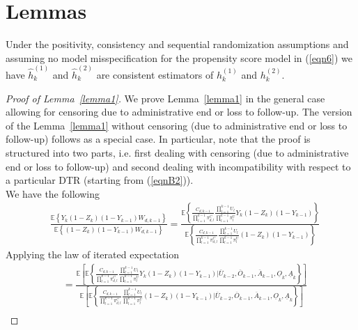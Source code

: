 \documentclass[12pt]{article}
\begin{document}
\section{Lemmas} \label{app1}

\begin{lemma}
\label{lemma1}
Under the positivity, consistency and sequential randomization assumptions and assuming no model misspecification for the propensity score model in (\ref{eqn6}) we have $\hat{h}_k^{(1)}$ and $\hat{h}_k^{(2)}$ are consistent estimators of $h_k^{(1)}$ and $h_k^{(2)}$. 
\end{lemma}

\begin{proof}[Proof of Lemma~\ref{lemma1}]
We prove Lemma~\ref{lemma1} in the general case allowing for censoring due to administrative end or loss to follow-up. The version of the Lemma~\ref{lemma1} without censoring (due to administrative end or loss to follow-up) follows as a special case. In particular, note that the proof is structured into two parts, i.e. first dealing with censoring (due to administrative end or loss to follow-up) and second dealing with incompatibility with respect to a particular DTR (starting from (\ref{eqnB2})).   \\
We have the following
\begin{align*}
&\frac{\mathbb{E} \left\lbrace Y_{k} \left(1-Z_{k} \right) \left(1-Y_{k-1} \right) W_{d,k-1} \right\rbrace}{\mathbb{E} \left\lbrace \left(1-Z_{k} \right) \left(1-Y_{k-1} \right) W_{d,k-1} \right\rbrace} = \frac{\mathbb{E} \left\lbrace \frac{C_{d,k-1}}{\prod_{l=1}^{k-1}  \pi^C_{d,l}} \frac{ \prod_{l=1}^{k-1} U_{l}}{\prod_{l=1}^{k-1}  \pi^U_{l}} Y_{k} \left(1-Z_{k} \right) \left(1-Y_{k-1} \right) \right\rbrace}{\mathbb{E} \left\lbrace \frac{C_{d,k-1}}{\prod_{l=1}^{k-1}  \pi^C_{d,l}} \frac{ \prod_{l=1}^{k-1} U_{l}}{\prod_{l=1}^{k-1}  \pi^U_{l}} \left(1-Z_{k} \right) \left(1-Y_{k-1} \right) \right\rbrace} 
\end{align*}
Applying the law of iterated expectation
\begin{align*}
&= \frac{\mathbb{E} \left[ \mathbb{E} \left\lbrace \frac{C_{d,k-1}}{\prod_{l=1}^{k-1}  \pi^C_{d,l}} \frac{ \prod_{l=1}^{k-1} U_{l}}{\prod_{l=1}^{k-1}  \pi^U_{l}} Y_{k} \left(1-Z_{k} \right) \left(1-Y_{k-1} \right) \vert \overline{U}_{k-2}, \overline{O}_{k-1}, \overline{A}_{k-1}, \underline{O}_{k}, \underline{A}_{k} \right\rbrace \right]}{\mathbb{E} \left[ \mathbb{E} \left\lbrace \frac{C_{d,k-1}}{\prod_{l=1}^{k-1}  \pi^C_{d,l}} \frac{ \prod_{l=1}^{k-1} U_{l}}{\prod_{l=1}^{k-1}  \pi^U_{l}} \left(1-Z_{k} \right) \left(1-Y_{k-1} \right) \vert  \overline{U}_{k-2}, \overline{O}_{k-1}, \overline{A}_{k-1}, \underline{O}_{k}, \underline{A}_{k} \right\rbrace \right]} \\

\end{align*}
\end{proof}
\end{document}
